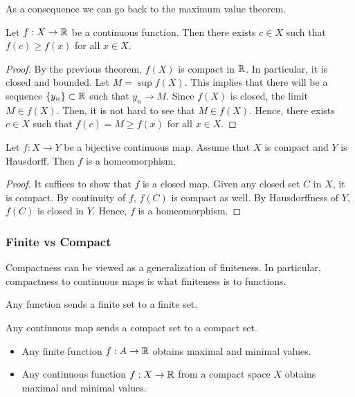 As a consequence we can go back to the maximum value theorem.

\begin{corollary}
    Let $f:X\to\mathbb{R}$ be a continuous function. Then there exists $c\in X$ such that $f(c)\ge f(x)$ for all $x\in X$.
\end{corollary}
\begin{proof}
    By the previous theorem, $f(X)$ is compact in $\mathbb{R}$. In particular, it is closed and bounded. Let $M=\sup f(X)$. This implies that there will be a sequence $\{y_n\}\subset\mathbb{R}$ such that $y_n\to M$. Since $f(X)$ is closed, the limit $M\in f(X)$. Then, it is not hard to see that $M\in f(X)$. Hence, there exists $c\in X$ such that $f(c)=M\ge f(x)$ for all $x\in X$.
\end{proof}

\begin{theorem}
    Let $f:X\to Y$ be a bijective continuous map. Assume that $X$ is compact and $Y$ is Hausdorff. Then $f$ is a homeomorphism.
\end{theorem}
\begin{proof}
    It suffices to show that $f$ is a closed map. Given any closed set $C$ in $X$, it is compact. By continuity of $f$, $f(C)$ is compact as well. By Hausdorffness of $Y$, $f(C)$ is closed in $Y$. Hence, $f$ is a homeomorphism.
\end{proof}



\subsubsection*{Finite vs Compact}

Compactness can be viewed as a generalization of finiteness. In particular, compactness to continuous maps is what finiteness is to functions. 


\begin{proposition}
    Any function sends a finite set to a finite set.

    Any continuous map sends a compact set to a compact set.
\end{proposition}

\begin{theorem}
    \begin{itemize}
        \item Any finite function $f:A\to \mathbb{R}$ obtains maximal and minimal values.
        \item Any continuous function $f:X\to \mathbb{R}$ from a compact space $X$ obtains maximal and minimal values. 
    \end{itemize}
\end{theorem}

